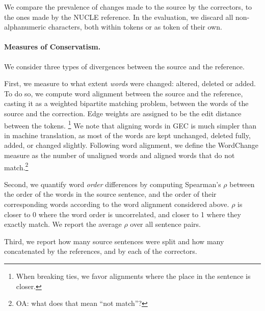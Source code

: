 \documentclass[letter,11pt]{article}
\newcommand{\oa}[1]{\footnote{\color{red}OA: #1}}
\begin{document}
We compare the prevalence of changes made to the source by the correctors,
to the ones made by the NUCLE reference. In the evaluation, we discard all non-alphanumeric
characters, both within tokens or as token of their own.



\paragraph{Measures of Conservatism.}
We consider three types of divergences between the source and the reference.

First, we measure to what extent \emph{words} were changed: altered, deleted or added.
To do so, we compute word alignment between the source and the reference, casting it
as a weighted bipartite matching problem, between the words of the source
and the correction. 
Edge weights are assigned to be the edit distance between the tokens.
\footnote{When breaking ties, we favor alignments where the place in the sentence is closer.}
We note that aligning words in GEC is much simpler than in machine translation,
as most of the words are kept unchanged, deleted fully, added, or changed slightly.
Following word alignment, we define the {\sc WordChange} measure
as the number of unaligned words and aligned words that do
not match.\oa{what does that mean ``not match''?}

Second, we quantify word \emph{order} differences by computing
Spearman's $\rho$ between the order of the words in the source sentence,
and the order of their corresponding words according to the word alignment considered above.
$\rho$ is closer to 0 where the word order is uncorrelated, and closer to 1 where they
exactly match. We report the average $\rho$ over all sentence pairs. 

Third, we report how many source sentences were split and how many concatenated by the references,
and by each of the correctors.
\end{document}
